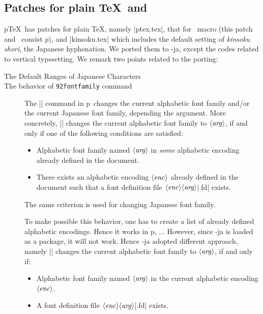 \documentclass{ajt}
\begin{document}
\subsection{Patches for plain \TeX\ and \LaTeXe}
p\TeX\ has patches for plain \TeX, namely |ptex.tex|, that for \LaTeXe\
macro (this patch and \LaTeXe\ consist \emph{p\LaTeXe}), and
|kinsoku.tex| which includes the default setting of \emph{kinsoku
shori}, the Japanese hyphenation.  We ported them to \LuaTeX-ja, except
the codes related to vertical typesetting. We remark two points related to the porting:
\begin{description}
\item[The Default Ranges of Japanese Characters] 


\item[The behavior of\/ {\tt\char92fontfamily\/} command]
The |\fontfamily| command in p\LaTeXe\ changes the current alphabetic
	   font family and/or the current Japanese font family,
	   depending the argument. More concretely,
	   || changes the
	   current alphabetic font family to $\langle\hbox{\it
	   arg\/}\rangle$, if and only if one of the following
	   conditions are satisfied:
\begin{itemize}
\item Alphabetic font family named $\langle\hbox{\it arg\/}\rangle$ in
      \emph{some} alphabetic encoding already defined in the document.
\item There exists an alphabetic encoding $\langle\hbox{\it
      enc\/}\rangle$ already defined in the document such that a font
      definition file $\langle\hbox{\it enc\/}\rangle\langle\hbox{\it
      arg\/}\rangle$|.fd| exists.
\end{itemize}
The same criterion is used for changing Japanese font family.

To make possible this behavior, one has to create a list of already
	   defined alphabetic encodings. Hence it works in p\LaTeXe, ...
However, since \LuaTeX-ja is loaded as a package, it will not
	   work. Hence \LuaTeX-ja adopted different approach, namely
	   || changes the
	   current alphabetic font family to $\langle\hbox{\it
	   arg\/}\rangle$, if and only if:
\begin{itemize}
\item Alphabetic font family named $\langle\hbox{\it arg\/}\rangle$ in the current alphabetic encoding $\langle\hbox{\it enc\/}\rangle$.
\item A  font definition file $\langle\hbox{\it enc\/}\rangle\langle\hbox{\it
      arg\/}\rangle$|.fd| exists.
\end{itemize}


\end{description}
\end{document}
